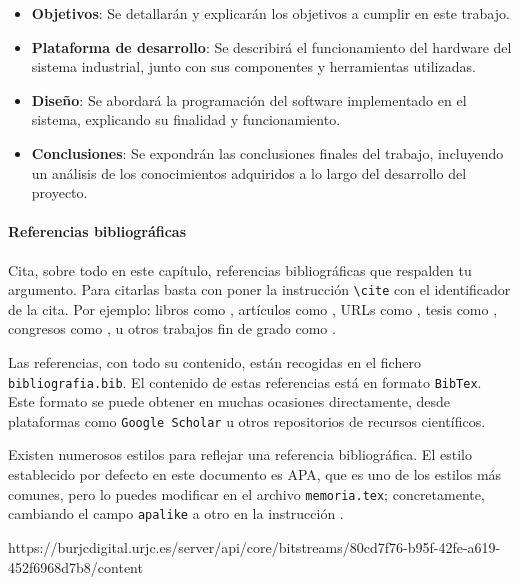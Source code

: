 \begin{itemize}
    \item \textbf{Objetivos}: Se detallarán y explicarán los objetivos a cumplir en este trabajo.
    \item \textbf{Plataforma de desarrollo}: Se describirá el funcionamiento del hardware del sistema industrial, junto con sus componentes y herramientas utilizadas.
    \item \textbf{Diseño}: Se abordará la programación del software implementado en el sistema, explicando su finalidad y funcionamiento.
    \item \textbf{Conclusiones}: Se expondrán las conclusiones finales del trabajo, incluyendo un análisis de los conocimientos adquiridos a lo largo del desarrollo del proyecto.
\end{itemize}

\paragraph{Referencias bibliográficas}
\label{sec:referencias}

Cita, sobre todo en este capítulo, referencias bibliográficas que respalden tu argumento. Para citarlas basta con poner la instrucción \verb|\cite| con el identificador de la cita. Por ejemplo: libros como \cite{vega12e}, artículos como \cite{vega19b}, URLs como \cite{vega19a}, tesis como \cite{vega18b}, congresos como \cite{vega18a}, u otros trabajos fin de grado como \cite{vega08b}.

Las referencias, con todo su contenido, están recogidas en el fichero \texttt{bibliografia.bib}. El contenido de estas referencias está en formato \texttt{BibTex}. Este formato se puede obtener en muchas ocasiones directamente, desde plataformas como \texttt{Google Scholar} u otros repositorios de recursos científicos.

Existen numerosos estilos para reflejar una referencia bibliográfica. El estilo establecido por defecto en este documento es APA, que es uno de los estilos más comunes, pero lo puedes modificar en el archivo \texttt{memoria.tex}; concretamente, cambiando el campo \verb|apalike| a otro en la instrucción \verb||. 

https://burjcdigital.urjc.es/server/api/core/bitstreams/80cd7f76-b95f-42fe-a619-452f6968d7b8/content
